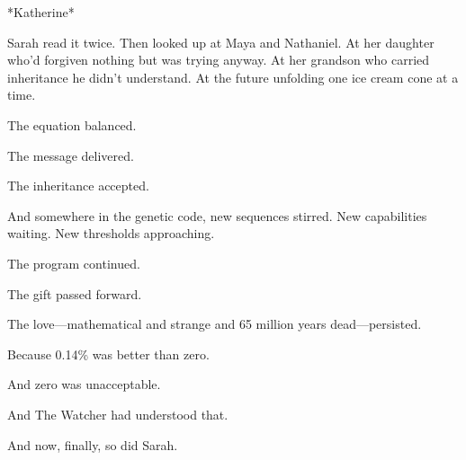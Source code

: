 *Katherine*

Sarah read it twice. Then looked up at Maya and Nathaniel. At her daughter who'd forgiven nothing but was trying anyway. At her grandson who carried inheritance he didn't understand. At the future unfolding one ice cream cone at a time.

The equation balanced.

The message delivered.

The inheritance accepted.

And somewhere in the genetic code, new sequences stirred. New capabilities waiting. New thresholds approaching.

The program continued.

The gift passed forward.

The love—mathematical and strange and 65 million years dead—persisted.

Because 0.14\% was better than zero.

And zero was unacceptable.

And The Watcher had understood that.

And now, finally, so did Sarah.

